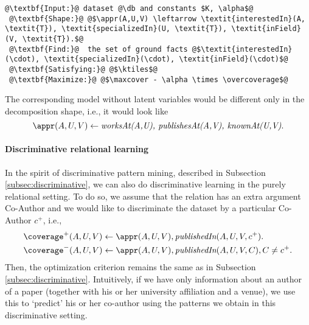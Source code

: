 \begin{lstlisting}[style=model,label=lst:ternary:model,caption=ReDF Purely Relational]
 @\textbf{Input:}@ dataset @\db and constants $K, \alpha$@
 @\textbf{Shape:}@ @$\appr(A,U,V) \leftarrow \textit{interestedIn}(A, \textit{T}), \textit{specializedIn}(U, \textit{T}), \textit{inField}(V, \textit{T}).$@
 @\textbf{Find:}@  the set of ground facts @$\textit{interestedIn}(\cdot), \textit{specializedIn}(\cdot), \textit{inField}(\cdot)$@
 @\textbf{Satisfying:}@ @$\ktiles$@
 @\textbf{Maximize:}@ @$\maxcover - \alpha \times \overcoverage$@
\end{lstlisting}
The corresponding model without latent variables would be different only in the decomposition shape, i.e., it would look like
\begin{equation*}
\appr(A,U,V) \leftarrow  \textit{worksAt(A,U), publishesAt(A,V), knownAt(U,V)}.
\end{equation*}

\paragraph{Discriminative relational learning}
In the spirit of discriminative pattern mining, described in Subsection \ref{subsec:discriminative}, we can also do discriminative learning in the purely relational setting. To do so, we assume that the relation has an extra argument Co-Author and we would like to discriminate the dataset by a particular Co-Author $c^+$, i.e., 
\begin{equation}
\begin{aligned}
 &\coverage^+(A,U,V) \leftarrow \appr(A,U,V), \textit{publishedIn}(A,U,V,c^+).\\
 &\coverage^-(A,U,V) \leftarrow \appr(A,U,V), \textit{publishedIn}(A,U,V,C), C \neq c^+.
\end{aligned} \label{eq:pure_relational_discriminative}
\end{equation}
Then, the optimization criterion remains the same as in Subsection \ref{subsec:discriminative}. Intuitively, if we have only information about an author of a paper (together with his or her university affiliation and a venue), we use this to `predict' his or her co-author using the patterns we obtain in this discriminative setting.




